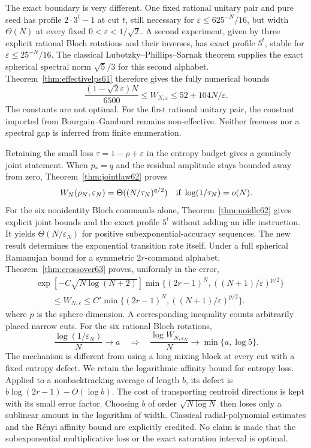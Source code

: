 The exact boundary is very different. One fixed rational unitary pair
and pure seed has profile $2\cdot3^t-1$ at cut $t$, still necessary for
$\varepsilon\le625^{-N}/16$, but width $\Theta(N)$ at every fixed
$0<\varepsilon<1/\sqrt2$. A second experiment, given by three explicit
rational Bloch rotations and their inverses, has exact profile $5^t$,
stable for $\varepsilon\le25^{-N}/16$. The classical
Lubotzky--Phillips--Sarnak theorem supplies the exact spherical spectral
norm $\sqrt5/3$ for this second alphabet. Theorem~\ref{thm:effectivelps61}
therefore gives the fully numerical bounds
\[
 \frac{(1-\sqrt2\varepsilon)N}{6500}
 \le W_{N,\varepsilon}\le52+104N/\varepsilon.
\]
The constants are not optimal. For the first rational unitary pair, the
constant imported from Bourgain--Gamburd remains non-effective. Neither
freeness nor a spectral gap is inferred from finite enumeration.

Retaining the small loss $\tau=1-\rho+\varepsilon$ in the entropy
budget gives a genuinely joint statement. When $p_*=q$ and the residual
amplitude stays bounded away from zero, Theorem~\ref{thm:jointlaw62}
proves
\[
 W_N(\rho_N,\varepsilon_N)=\Theta((N/\tau_N)^{q/2})
 \quad\hbox{if }\log(1/\tau_N)=o(N).
\]
For the six nonidentity Bloch commands alone,
Theorem~\ref{thm:noidle62} gives explicit joint bounds and the exact
profile $5^t$ without adding an idle instruction. It yields
$\Theta(N/\varepsilon_N)$ for positive subexponential-accuracy sequences.
The new result determines the exponential transition rate itself.
Under a full spherical Ramanujan bound for a symmetric $2r$-command
alphabet, Theorem~\ref{thm:crossover63} proves, uniformly in the error,
\[
 \begin{split}
 &\exp[-C\sqrt{N\log(N+2)}]
      \min\{(2r-1)^N,((N+1)/\varepsilon)^{p/2}\}\\
 &\hspace{2em}\le W_{N,\varepsilon}
      \le C'\min\{(2r-1)^N,((N+1)/\varepsilon)^{p/2}\}.
 \end{split}
\]
where $p$ is the sphere dimension. A corresponding inequality counts
arbitrarily placed narrow cuts. For the six rational Bloch rotations,
\[
 \frac{\log(1/\varepsilon_N)}N\longrightarrow a
 \quad\Longrightarrow\quad
 \frac{\log W_{N,\varepsilon_N}}N\longrightarrow\min\{a,\log5\}.
\]
The mechanism is different from using a long mixing block at every
cut with a fixed entropy defect. We retain the logarithmic affinity
bound for entropy loss. Applied to a nonbacktracking average of length
$b$, its defect is $b\log(2r-1)-O(\log b)$. The cost of transporting
centroid directions is kept with its small error factor. Choosing
$b$ of order $\sqrt{N\log N}$ then loses only a sublinear amount in
the logarithm of width. Classical radial-polynomial estimates and the
R\'enyi affinity bound are explicitly credited. No claim is made that
the subexponential multiplicative loss or the exact saturation interval
is optimal.

